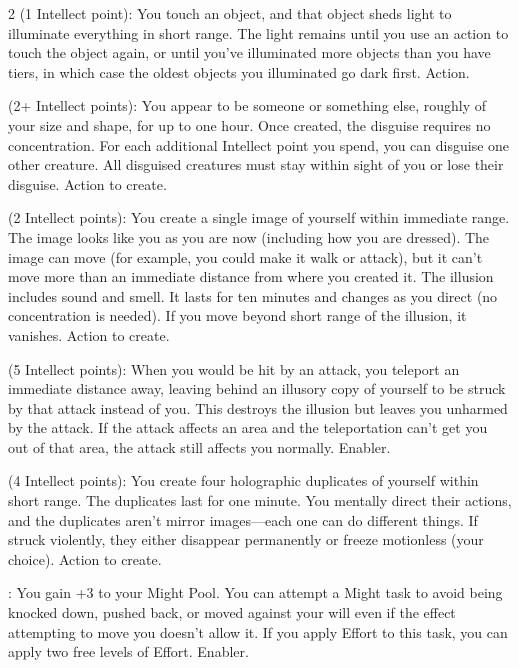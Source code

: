 \begin{multicols}{2}
 (1 Intellect point): You touch an object, and that object sheds light to illuminate everything in short range. The light remains until you use an action to touch the object again, or until you’ve illuminated more objects than you have tiers, in which case the oldest objects you illuminated go dark first. Action.
 
 (2+ Intellect points): You appear to be someone or something else, roughly of your size and shape, for up to one hour. Once created, the disguise requires no concentration. For each additional Intellect point you spend, you can disguise one other creature. All disguised creatures must stay within sight of you or lose their disguise. Action to create.
 
 (2 Intellect points): You create a single image of yourself within immediate range. The image looks like you as you are now (including how you are dressed). The image can move (for example, you could make it walk or attack), but it can’t move more than an immediate distance from where you created it. The illusion includes sound and smell. It lasts for ten minutes and changes as you direct (no concentration is needed). If you move beyond short range of the illusion, it vanishes. Action to create. 
 
 (5 Intellect points): When you would be hit by an attack, you teleport an immediate distance away, leaving behind an illusory copy of yourself to be struck by that attack instead of you. This destroys the illusion but leaves you unharmed by the attack. If the attack affects an area and the teleportation can’t get you out of that area, the attack still affects you normally. Enabler. 
 
 (4 Intellect points): You create four holographic duplicates of yourself within short range. The duplicates last for one minute. You mentally direct their actions, and the duplicates aren’t mirror images—each one can do different things. If struck violently, they either disappear permanently or freeze motionless (your choice). Action to create. 
 
: You gain +3 to your Might Pool. You can attempt a Might task to avoid being knocked down, pushed back, or moved against your will even if the effect attempting to move you doesn’t allow it. If you apply Effort to this task, you can apply two free levels of Effort. Enabler.
 

\end{multicols}
